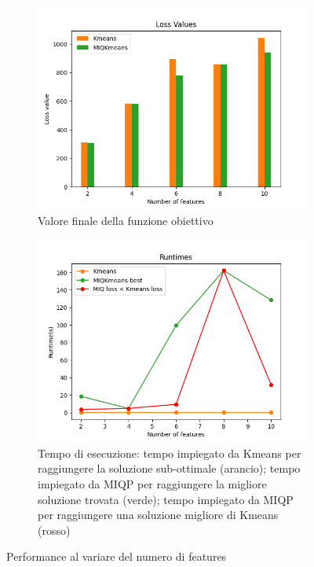\documentclass{article}
\begin{document}
    \begin{figure}[H]
     \centering
     \begin{subfigure}[t]{0.49\linewidth}
         \centering
         \includegraphics[width=\linewidth]{../results/plots/loss_features_sint}
         \caption{Valore finale della funzione obiettivo}
     \end{subfigure}
     \hfill
     \begin{subfigure}[t]{0.49\linewidth}
         \centering
         \includegraphics[width=\linewidth]{../results/plots/runtime_features_sint}
         \caption{Tempo di esecuzione: tempo impiegato da Kmeans per raggiungere la soluzione sub-ottimale (arancio); tempo impiegato da MIQP per raggiungere la migliore soluzione trovata (verde); tempo impiegato da MIQP per raggiungere una soluzione migliore di Kmeans (rosso)}
     \end{subfigure}
        \label{fig:6}
        \caption{Performance al variare del numero di features}
     \end{figure}
\end{document}
